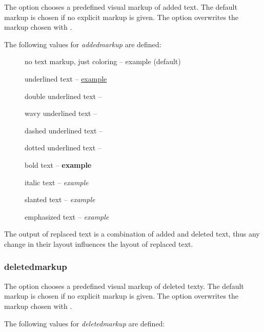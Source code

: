 
The  option chooses a predefined visual markup of added text.
The default markup is chosen if no explicit markup is given.
The option  overwrites the markup chosen with .

The following values for \emph{addedmarkup} are defined:

\begin{description}
	\item [] no text markup, just coloring -- {\color{orange} example} (default)
	\item [] underlined text -- \uline{example}
	\item [] double underlined text -- 
	\item [] wavy underlined text -- 
	\item [] dashed underlined text -- 
	\item [] dotted underlined text -- 
	\item [] bold text -- \textbf{example}
	\item [] italic text -- \textit{example}
	\item [] slanted text -- \textsl{example}
	\item [] emphasized text -- \emph{example}
\end{description}

The output of replaced text is a combination of added and deleted text, thus any change in their layout influences the layout of replaced text.



\subsubsection{deletedmarkup}
\label{sec:ui:options:deletedmarkup}


The  option chooses a predefined visual markup of deleted texty.
The default markup is chosen if no explicit markup is given.
The option  overwrites the markup chosen with .

The following values for \emph{deletedmarkup} are defined:

